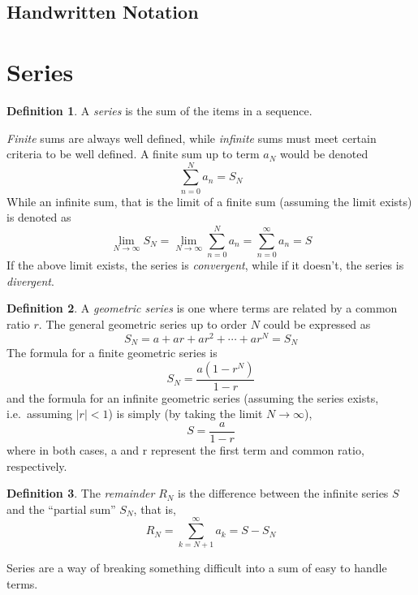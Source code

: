 \documentclass[10pt]{scrartcl}
\numberwithin{equation}{subsection}
\theoremstyle{definition}
\newtheorem{definition}{Definition}[section]
\theoremstyle{remark}
\newenvironment{definitionSR}
{
\begin{siderules}
\begin{definition}
}
{
\end{definition}
\end{siderules}
}
\begin{document}
\subsection{Handwritten Notation}

\section{Series}
\begin{definitionSR}
A \textit{series} is the sum of the items in a sequence.
\end{definitionSR}


\emph{Finite} sums are always well defined, while \emph{infinite} sums must meet certain criteria to be well defined. A finite sum up to term $a_N$ would be denoted
\[
	\sum_{n=0}^N a_n = S_N
\]
While an infinite sum, that is the limit of a finite sum (assuming the limit exists) is denoted as
\[
	\lim_{N \to \infty} S_N = \lim_{N \to \infty} \sum_{n=0}^N a_n = \sum_{n=0}^\infty a_n = S
\]
If the above limit exists, the series is \textit{convergent}, while if it doesn't, the series is \textit{divergent}.

\begin{definitionSR}
A \textit{geometric series} is one where terms are related by a common ratio $r$. The general geometric series up to order $N$ could be expressed as
  \[
      S_N = a + ar + ar^2 + \cdots + ar^N = S_N
  \]
The formula for a finite geometric series is
  \begin{equation}
  S_N = \frac{a(1-r^N)}{1-r}
  \end{equation}
and the formula for an infinite geometric series (assuming the series exists, i.e.\ assuming $|r|<1$) is simply (by taking the limit $N \to \infty$),
  \begin{equation}
  S = \frac{a}{1-r}
  \end{equation}
where in both cases, a and r represent the first term and common ratio, respectively.\\
\end{definitionSR}


\begin{definitionSR}
The \textit{remainder} $R_N$ is the difference between the infinite series $S$ and the ``partial sum'' $S_N$, that is,
\[
	R_N = \sum_{k=N+1}^\infty a_k = S-S_N
\]
\end{definitionSR}

Series are a way of breaking something difficult into a sum of easy to handle terms.
\end{document}
